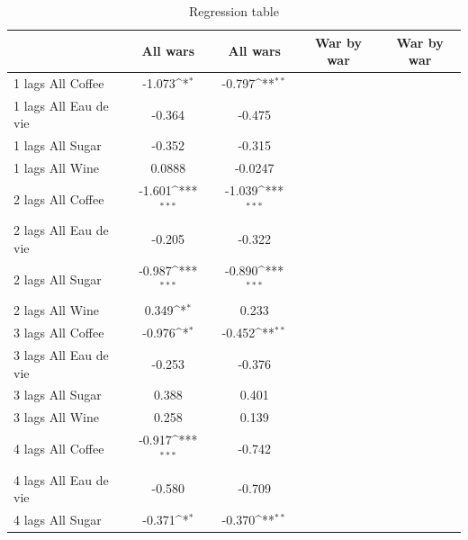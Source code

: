 \documentclass[12pt,a4paper,titlepage]{article}
\begin{document}
{
\def\sym#1{\ifmmode^{#1}\else\(^{#1}\)\fi}
\begin{longtable}{l*{4}{c}}
\caption{Regression table\label{tab1}}\\
\toprule\endfirsthead\midrule\endhead\midrule\endfoot\endlastfoot
                    &\multicolumn{1}{c}{All wars}&\multicolumn{1}{c}{All wars}&\multicolumn{1}{c}{War by war}&\multicolumn{1}{c}{War by war}\\
\midrule
1 lags All Coffee   &      -1.073\sym{*}  &      -0.797\sym{**} &                     &                     \\
1 lags All Eau de vie&      -0.364         &      -0.475         &                     &                     \\
1 lags All Sugar    &      -0.352         &      -0.315         &                     &                     \\
1 lags All Wine     &      0.0888         &     -0.0247         &                     &                     \\
2 lags All Coffee   &      -1.601\sym{***}&      -1.039\sym{***}&                     &                     \\
2 lags All Eau de vie&      -0.205         &      -0.322         &                     &                     \\
2 lags All Sugar    &      -0.987\sym{***}&      -0.890\sym{***}&                     &                     \\
2 lags All Wine     &       0.349\sym{*}  &       0.233         &                     &                     \\
3 lags All Coffee   &      -0.976\sym{*}  &      -0.452\sym{**} &                     &                     \\
3 lags All Eau de vie&      -0.253         &      -0.376         &                     &                     \\
3 lags All Sugar    &       0.388         &       0.401         &                     &                     \\
3 lags All Wine     &       0.258         &       0.139         &                     &                     \\
4 lags All Coffee   &      -0.917\sym{***}&      -0.742         &                     &                     \\
4 lags All Eau de vie&      -0.580         &      -0.709         &                     &                     \\
4 lags All Sugar    &      -0.371\sym{*}  &      -0.370\sym{**} &                     &                     \\

\end{longtable}}
\end{document}
